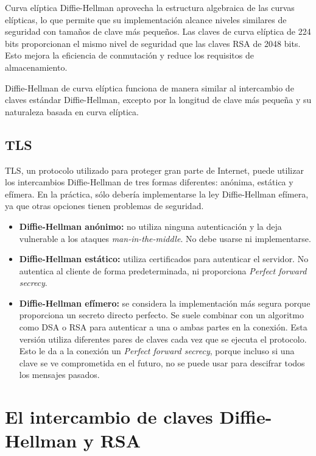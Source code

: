 \documentclass[11pt]{article}
\begin{document}
Curva elíptica Diffie-Hellman aprovecha la estructura algebraica de las curvas elípticas, lo que permite que su implementación alcance niveles similares de seguridad con tamaños de clave más pequeños. Las claves de curva elíptica de 224 bits proporcionan el mismo nivel de seguridad que las claves RSA de 2048 bits. Esto mejora la eficiencia de conmutación y reduce los requisitos de almacenamiento.

Diffie-Hellman de curva elíptica funciona de manera similar al intercambio de claves estándar Diffie-Hellman, excepto por la longitud de clave más pequeña y su naturaleza basada en curva elíptica.
\\
\subsection{TLS}

TLS, un protocolo utilizado para proteger gran parte de Internet, puede utilizar los intercambios Diffie-Hellman de tres formas diferentes: anónima, estática y efímera. En la práctica, sólo debería implementarse la ley Diffie-Hellman efímera, ya que otras opciones tienen problemas de seguridad.


\begin{itemize}
    \item \textbf{Diffie-Hellman anónimo:} no utiliza ninguna autenticación y la deja vulnerable a los ataques \emph{man-in-the-middle}. No debe usarse ni implementarse.
    \item \textbf{Diffie-Hellman estático:} utiliza certificados para autenticar el servidor. No autentica al cliente de forma predeterminada, ni proporciona \emph{Perfect forward secrecy}.
    \item \textbf{Diffie-Hellman efímero:} se considera la implementación más segura porque proporciona un secreto directo perfecto. Se  suele combinar con un algoritmo como DSA o RSA para autenticar a una o ambas partes en la conexión. Esta versión utiliza diferentes pares de claves cada vez que se ejecuta el protocolo. Esto le da a la conexión un \emph{Perfect forward secrecy}, porque incluso si una clave se ve comprometida en el futuro, no se puede usar para descifrar todos los mensajes pasados.\\
\end{itemize}

\newpage


\section{El intercambio de claves Diffie-Hellman y RSA}
\end{document}
